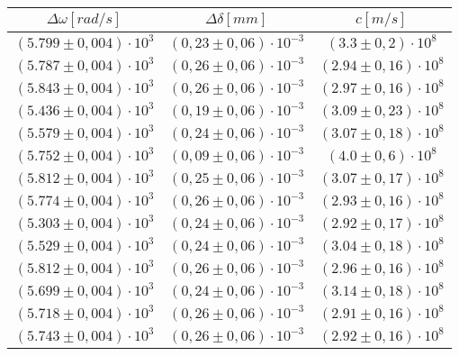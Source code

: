 \begin{table}[H]
    \centering
        \begin{tabular}{|c|c|c|}
        \hline
        $ \Delta\omega [rad/s] $ & $ \Delta\delta [mm] $ & $ c [m/s] $\\
        \hline
        $ (5.799 \pm 0,004) \cdot 10^{3} $ & $ (0,23 \pm 0,06) \cdot 10^{-3} $ & $ (3.3 \pm 0,2) \cdot 10^{8} $\\
        \hline
        $ (5.787 \pm 0,004) \cdot 10^{3} $ & $ (0,26 \pm 0,06) \cdot 10^{-3} $ & $ (2.94 \pm 0,16) \cdot 10^{8} $\\
        \hline
        $ (5.843 \pm 0,004) \cdot 10^{3} $ & $ (0,26 \pm 0,06) \cdot 10^{-3} $ & $ (2.97 \pm 0,16) \cdot 10^{8} $\\
        \hline
        $ (5.436 \pm 0,004) \cdot 10^{3} $ & $ (0,19 \pm 0,06) \cdot 10^{-3} $ & $ (3.09 \pm 0,23) \cdot 10^{8} $\\
        \hline
        $ (5.579 \pm 0,004) \cdot 10^{3} $ & $ (0,24 \pm 0,06) \cdot 10^{-3} $ & $ (3.07 \pm 0,18) \cdot 10^{8} $\\
        \hline
        $ (5.752 \pm 0,004) \cdot 10^{3} $ & $ (0,09 \pm 0,06) \cdot 10^{-3} $ & $ (4.0 \pm 0,6) \cdot 10^{8} $\\
        \hline
        $ (5.812 \pm 0,004) \cdot 10^{3} $ & $ (0,25 \pm 0,06) \cdot 10^{-3} $ & $ (3.07 \pm 0,17) \cdot 10^{8} $\\
        \hline
        $ (5.774 \pm 0,004) \cdot 10^{3} $ & $ (0,26 \pm 0,06) \cdot 10^{-3} $ & $ (2.93 \pm 0,16) \cdot 10^{8} $\\
        \hline
        $ (5.303 \pm 0,004) \cdot 10^{3} $ & $ (0,24 \pm 0,06) \cdot 10^{-3} $ & $ (2.92 \pm 0,17) \cdot 10^{8} $\\
        \hline
        $ (5.529 \pm 0,004) \cdot 10^{3} $ & $ (0,24 \pm 0,06) \cdot 10^{-3} $ & $ (3.04 \pm 0,18) \cdot 10^{8} $\\
        \hline
        $ (5.812 \pm 0,004) \cdot 10^{3} $ & $ (0,26 \pm 0,06) \cdot 10^{-3} $ & $ (2.96 \pm 0,16) \cdot 10^{8} $\\
        \hline
        $ (5.699 \pm 0,004) \cdot 10^{3} $ & $ (0,24 \pm 0,06) \cdot 10^{-3} $ & $ (3.14 \pm 0,18) \cdot 10^{8} $\\
        \hline
        $ (5.718 \pm 0,004) \cdot 10^{3} $ & $ (0,26 \pm 0,06) \cdot 10^{-3} $ & $ (2.91 \pm 0,16) \cdot 10^{8} $\\
        \hline
        $ (5.743 \pm 0,004) \cdot 10^{3} $ & $ (0,26 \pm 0,06) \cdot 10^{-3} $ & $ (2.92 \pm 0,16) \cdot 10^{8} $\\

\end{tabular}
\end{table}
